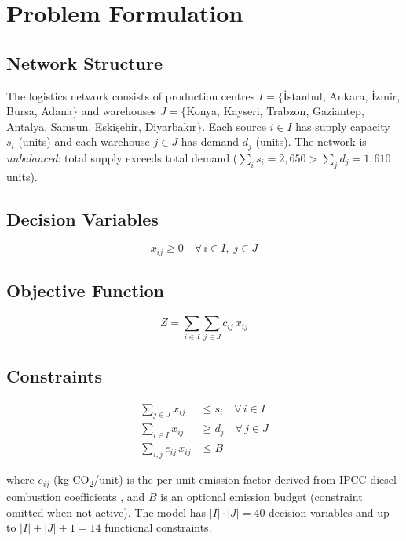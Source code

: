 \documentclass[conference]{IEEEtran}
\begin{document}
\section{Problem Formulation}
\label{sec:problem}

\subsection{Network Structure}

The logistics network consists of production centres
$I = \{$\.Istanbul, Ankara, \.Izmir, Bursa, Adana$\}$ and
warehouses
$J = \{$Konya, Kayseri, Trabzon, Gaziantep, Antalya,
Samsun, Eski\c{s}ehir, Diyarbak\i r$\}$.
Each source $i \in I$ has supply capacity $s_i$ (units)
and each warehouse $j \in J$ has demand $d_j$ (units).
The network is \emph{unbalanced}: total supply exceeds total demand
($\sum_i s_i = 2{,}650 > \sum_j d_j = 1{,}610$ units).

\subsection{Decision Variables}

$$x_{ij} \geq 0 \quad \forall\, i \in I,\; j \in J$$

\subsection{Objective Function}

\begin{equation}
  Z = \sum_{i \in I}\sum_{j \in J} c_{ij}\, x_{ij}
  \label{eq:objective}
\end{equation}

\subsection{Constraints}

\begin{align}
  \sum_{j \in J} x_{ij} &\leq s_i \quad \forall\, i \in I
  \label{eq:supply} \\
  \sum_{i \in I} x_{ij} &\geq d_j \quad \forall\, j \in J
  \label{eq:demand} \\
  \sum_{i,j} e_{ij}\, x_{ij} &\leq B
  \label{eq:co2}
\end{align}

where $e_{ij}$ (kg CO\textsubscript{2}/unit) is the per-unit emission factor
derived from IPCC diesel combustion coefficients \cite{ipcc},
and $B$ is an optional emission budget (constraint omitted when not active).
The model has $|I| \cdot |J| = 40$ decision variables and up to
$|I| + |J| + 1 = 14$ functional constraints.
\end{document}

